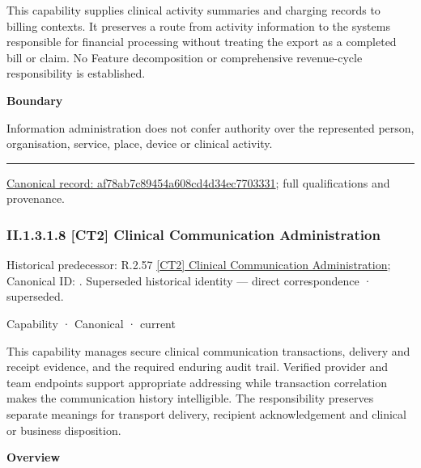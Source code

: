 This capability supplies clinical activity summaries and charging records to billing contexts. It preserves a route from activity information to the systems responsible for financial processing without treating the export as a completed bill or claim. No Feature decomposition or comprehensive revenue-cycle responsibility is established.



\textbf{Boundary}



Information administration does not confer authority over the represented person, organisation, service, place, device or clinical activity.



\medskip\hrule\medskip

{\footnotesize \href{../../../../../../../continuum/strategy/capability/af78ab7c89454a608cd4d34ec7703331.md}{Canonical record: af78ab7c89454a608cd4d34ec7703331}; full qualifications and provenance.}\par
\subsubsection*{II.1.3.1.8 [CT2] Clinical Communication Administration}
\label{navigation:II.1.3.1.8}

{\small Historical predecessor: R.2.57 \hyperref[element:bd4d6f4a7f03402ba7857383c7be7a4c]{[CT2] Clinical Communication Administration}; Canonical ID: \texttt{}. Superseded historical identity — direct correspondence · superseded.}\par
\label{element:b38f2c2811724734b5887b6dbaaabbfc}
{\small Capability · Canonical · current}\par

This capability manages secure clinical communication transactions, delivery and receipt evidence, and the required enduring audit trail. Verified provider and team endpoints support appropriate addressing while transaction correlation makes the communication history intelligible. The responsibility preserves separate meanings for transport delivery, recipient acknowledgement and clinical or business disposition.



\textbf{Overview}



